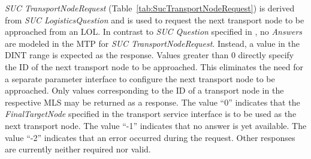 \emph{SUC TransportNodeRequest} (Table~\ref{tab:SucTransportNodeRequest}) is derived from \emph{SUC LogisticsQuestion} and is used to request the next transport node to be approached from an LOL. In contrast to \emph{SUC Question} specified in \cite{PNO.2025.Part4}, no \emph{Answers} are modeled in the MTP for \emph{SUC TransportNodeRequest}. Instead, a value in the DINT range is expected as the response. Values greater than 0 directly specify the ID of the next transport node to be approached. This eliminates the need for a separate parameter interface to configure the next transport node to be approached. Only values corresponding to the ID of a transport node in the respective MLS may be returned as a response. The value \enquote{0} indicates that the \emph{FinalTargetNode} specified in the transport service interface is to be used as the next transport node. The value \enquote{-1} indicates that no answer is yet available. The value \enquote{-2} indicates that an error occurred during the request. Other responses are currently neither required nor valid.

